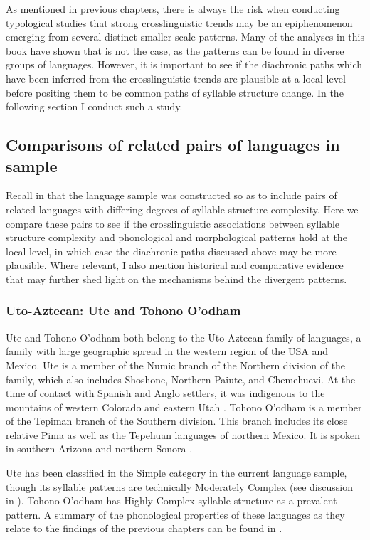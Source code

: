   As mentioned in previous chapters, there is always the risk when conducting typological studies that strong crosslinguistic trends may be an epiphenomenon emerging from several distinct smaller-scale patterns. Many of the analyses in this book have shown that is not the case, as the patterns can be found in diverse groups of languages. However, it is important to see if the diachronic paths which have been inferred from the crosslinguistic trends are plausible at a local level before positing them to be common paths of syllable structure change. In the following section I conduct such a study.

\subsection{Comparisons of related pairs of languages in sample}\label{sec:8.4.3}

  Recall in  that the language sample was constructed so as to include pairs of related languages with differing degrees of syllable structure complexity. Here we compare these pairs to see if the crosslinguistic associations between syllable structure complexity and phonological and morphological patterns hold at the local level, in which case the diachronic paths discussed above may be more plausible. Where relevant, I also mention historical and comparative evidence that may further shed light on the mechanisms behind the divergent patterns.

\subsubsection{{Uto-Aztecan:} {Ute} {and} {Tohono} {O’odham}}\label{sec:8.4.3.1}

  Ute and Tohono O’odham both belong to the Uto-Aztecan family of languages, a family with large geographic spread in the western region of the USA and Mexico. Ute is a member of the Numic branch of the Northern division of the family, which also includes Shoshone, Northern Paiute, and Chemehuevi. At the time of contact with Spanish and Anglo settlers, it was indigenous to the mountains of western Colorado and eastern Utah \citep{Givón2011}. Tohono O’odham is a member of the Tepiman branch of the Southern division. This branch includes its close relative Pima as well as the Tepehuan languages of northern Mexico. It is spoken in southern Arizona and northern Sonora \citep{Zepeda1983}.

  Ute has been classified in the Simple category in the current language sample, though its syllable patterns are technically Moderately Complex (see discussion in ). Tohono O’odham has Highly Complex syllable structure as a prevalent pattern. A summary of the phonological properties of these languages as they relate to the findings of the previous chapters can be found in .

